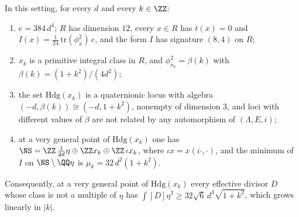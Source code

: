 \begin{proposition}\label{prop:pencil}
In this setting, for every $d$ and every $k\in\ZZ$:
\begin{enumerate}[label=\textup{(\roman*)},nosep]
\item $e=384\,d^{4}$; $R$ has dimension $12$, every $x\in R$ has $t(x)=0$
  and $I(x)=\tfrac{1}{24}\,\mathrm{tr}(\phi_{x}^{2})\,e$, and the form $I$ has
  signature $(8,4)$ on $R$;
\item $x_{k}$ is a primitive integral class in $R$, and
  $\phi_{x_{k}}^{2}=\beta(k)$ with $\beta(k)=(1+k^{2})/(4d^{2})$;
\item the set $\mathrm{Hdg}(x_{k})$ is a quaternionic locus with algebra
  $(-d,\beta(k))\cong(-d,1+k^{2})$, nonempty of dimension $3$, and loci with
  different values of $\beta$ are not related by any automorphism of
  $(\Lambda,E,i)$;
\item at a very general point of $\mathrm{Hdg}(x_{k})$ one has
  $\NS=\ZZ\,\tfrac{1}{2d}\eta\oplus\ZZ x_{k}\oplus\ZZ\,\iota x_{k}$, where
  $\iota x=x(i\cdot,\cdot)$, and the minimum of $I$ on $\NS\setminus\QQ\eta$
  is $\mu_{k}=32\,d^{2}(1+k^{2})$.
\end{enumerate}
Consequently, at a very general point of $\mathrm{Hdg}(x_{k})$ every effective
divisor $D$ whose class is not a multiple of $\eta$ has
$\int[D]\eta^{3}\ge32\sqrt{6}\,d^{3}\sqrt{1+k^{2}}$, which grows linearly in
$|k|$.
\end{proposition}

